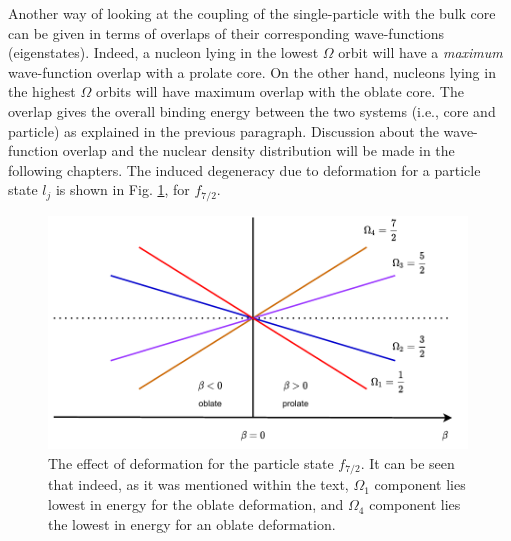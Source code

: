 Another way of looking at the coupling of the single-particle with the bulk core can be given in terms of overlaps of their corresponding wave-functions (eigenstates). Indeed, a nucleon lying in the lowest $\Omega$ orbit will have a \emph{maximum} wave-function overlap with a prolate core. On the other hand, nucleons lying in the highest $\Omega$ orbits will have maximum overlap with the oblate core. The overlap gives the overall binding energy between the two systems (i.e., core and particle) as explained in the previous paragraph. Discussion about the wave-function overlap and the nuclear density distribution \cite{frauendorf2014transverse, das2018nuclear} will be made in the following chapters. The induced degeneracy due to deformation for a particle state $l_j$ is shown in Fig. \ref{nillson-orbits-splittings}, for $f_{7/2}$.
\begin{figure}
    \centering
    \includegraphics[width=0.99\textwidth]{Chapters/Figures/nillson_SP_splittings.pdf}
    \caption{The effect of deformation for the particle state $f_{7/2}$. It can be seen that indeed, as it was mentioned within the text, $\Omega_1$ component lies lowest in energy for the oblate deformation, and $\Omega_4$ component lies the lowest in energy for an oblate deformation.}
    \label{nillson-orbits-splittings}
\end{figure}

